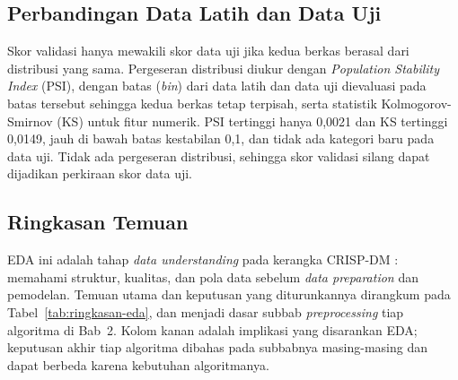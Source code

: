 \subsection{Perbandingan Data Latih dan Data Uji}
\label{subsec:eda-train-test}

Skor validasi hanya mewakili skor data uji jika kedua berkas berasal dari distribusi yang sama. Pergeseran distribusi diukur dengan \textit{Population Stability Index} (PSI), dengan batas (\textit{bin}) dari data latih dan data uji dievaluasi pada batas tersebut sehingga kedua berkas tetap terpisah, serta statistik Kolmogorov-Smirnov (KS) untuk fitur numerik. PSI tertinggi hanya 0,0021 dan KS tertinggi 0,0149, jauh di bawah batas kestabilan 0,1, dan tidak ada kategori baru pada data uji. Tidak ada pergeseran distribusi, sehingga skor validasi silang dapat dijadikan perkiraan skor data uji.

\subsection{Ringkasan Temuan}
\label{subsec:ringkasan-eda}

EDA ini adalah tahap \textit{data understanding} pada kerangka CRISP-DM \cite{slide-crispdm}: memahami struktur, kualitas, dan pola data sebelum \textit{data preparation} dan pemodelan. Temuan utama dan keputusan yang diturunkannya dirangkum pada Tabel~\ref{tab:ringkasan-eda}, dan menjadi dasar subbab \textit{preprocessing} tiap algoritma di Bab~2. Kolom kanan adalah implikasi yang disarankan EDA; keputusan akhir tiap algoritma dibahas pada subbabnya masing-masing dan dapat berbeda karena kebutuhan algoritmanya.


